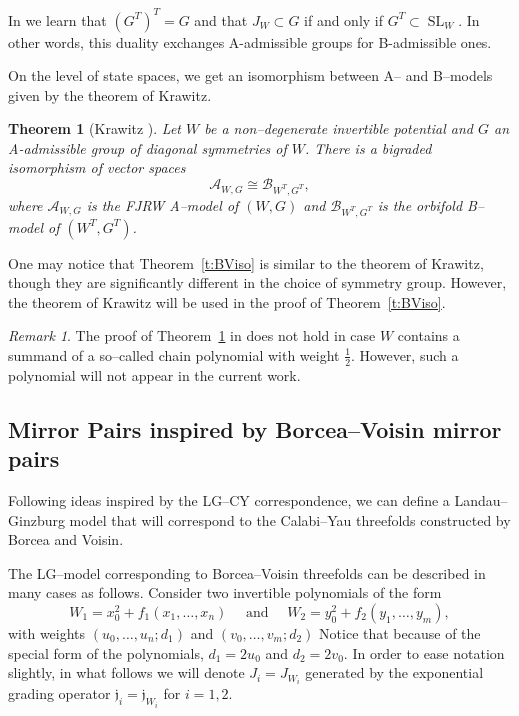 \documentclass[10pt, letterpaper]{amsart}
\newtheorem{thm}{Theorem}%
\theoremstyle{remark}
\newtheorem{rem}{Remark}[thm]
\newcommand{\sA}{\mathscr{A}}
\newcommand{\sB}{\mathscr{B}}
\newcommand{\jw}{\mathfrak{j}}
\DeclareMathOperator{\SL}{SL}
\begin{document}
In \cite[Proposition 3]{involutions} we learn that $(G^T)^T = G$ and that $J_W\subset G$ if and only if $G^T\subset \SL_W$. In other words, this duality exchanges A-admissible groups for B-admissible ones. 

On the level of state spaces, we get an isomorphism between A-- and B--models given by the theorem of Krawitz.

\begin{thm}[Krawitz \cite{Kr}]\label{t:krawitz}
Let $W$ be a non--degenerate invertible potential and $G$ an A-admissible group of diagonal symmetries of $W$.
There is a bigraded isomorphism of vector spaces
\[\sA_{W,G} \cong \sB_{W^T ,G^T} ,\]
where $\sA_{W,G}$ is the FJRW A--model of $(W, G)$ and $\sB_{W^T ,G^T}$ is the orbifold B--model of $(W^T
, G^T)$.
\end{thm}

One may notice that Theorem~\ref{t:BViso} is similar to the theorem of Krawitz, though they are significantly different in the choice of symmetry group. However, the theorem of Krawitz will be used in the proof of Theorem~\ref{t:BViso}.

\begin{rem}
The proof of Theorem~\ref{t:krawitz} in \cite{Kr} does not hold in case $W$ contains a summand of a so--called chain polynomial with weight $\tfrac 12$. However, such a polynomial will not appear in the current work. 
\end{rem}




\subsection{Mirror Pairs inspired by Borcea--Voisin mirror pairs}\label{ss:BVLGmodel}
Following ideas inspired by the LG--CY correspondence, we can define a Landau--Ginzburg model that will correspond to the Calabi--Yau threefolds constructed by Borcea and Voisin. 

The LG--model corresponding to Borcea--Voisin threefolds can be described in many cases as follows. Consider two invertible polynomials of the form 
\begin{equation}\label{e:wxwy}
W_1=x_0^2+f_1(x_1,\dots,x_n)\quad \text{ and }\quad W_2= y_0^2+f_2(y_1,\dots,y_m), 
\end{equation}
with weights $(u_0,\dots, u_n;d_1)$ and $(v_0,\dots,v_m;d_2)$ Notice that because of the special form of the polynomials, $d_1 = 2u_0$ and $d_2 = 2v_0$. In order to ease notation slightly, in what follows we will denote $J_i=J_{W_i}$ generated by the exponential grading operator $\jw_i=\jw_{W_i}$ for $i=1,2$.  
 
\end{document}
